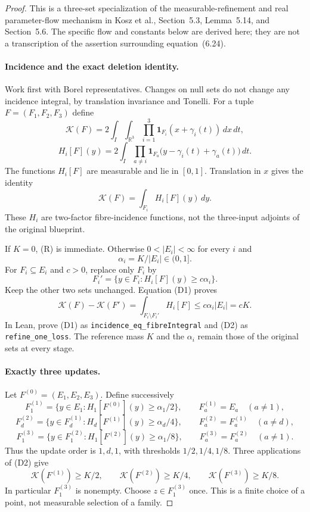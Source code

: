 \documentclass[11pt]{article}
\begin{document}
\begin{proof}
This is a three-set specialization of the measurable-refinement and real
parameter-flow mechanism in Kosz et al., Section~5.3, Lemma~5.14, and
Section~5.6. The specific flow and constants below are derived here; they
are not a transcription of the assertion surrounding equation~(6.24).

\paragraph{Incidence and the exact deletion identity.}
Work first with Borel representatives. Changes on null sets do not change
any incidence integral, by translation invariance and Tonelli. For a tuple
$F=(F_1,F_2,F_3)$ define
\[
 \mathcal K(F)=2\int_I\int_{\mathbb R^3}
       \prod_{i=1}^3\mathbf1_{F_i}(x+\gamma_i(t))\,dx\,dt,
\]
\[
 H_i[F](y)=2\int_I\prod_{a\ne i}
 \mathbf1_{F_a}\bigl(y-\gamma_i(t)+\gamma_a(t)\bigr)\,dt.
\]
The functions $H_i[F]$ are measurable and lie in $[0,1]$. Translation in
$x$ gives the identity
\[
 \mathcal K(F)=\int_{F_i}H_i[F](y)\,dy.                 \tag{D1}
\]
These $H_i$ are two-factor fibre-incidence functions, not the three-input
adjoints of the original blueprint.

If $K=0$, (R) is immediate. Otherwise $0<|E_i|<\infty$ for every $i$ and
\[
 \alpha_i=K/|E_i|\in(0,1].
\]
For $F_i\subseteq E_i$ and $c>0$, replace only $F_i$ by
\[
 F_i'=\{y\in F_i:H_i[F](y)\geq c\alpha_i\}.
\]
Keep the other two sets unchanged. Equation (D1) proves
\[
 \mathcal K(F)-\mathcal K(F')
 =\int_{F_i\setminus F_i'}H_i[F]
 \leq c\alpha_i|E_i|=cK.                             \tag{D2}
\]
In Lean, prove (D1) as \texttt{incidence\_eq\_fibreIntegral} and (D2) as
\texttt{refine\_one\_loss}. The reference mass $K$ and the $\alpha_i$
remain those of the original sets at every stage.

\paragraph{Exactly three updates.}
Let $F^{(0)}=(E_1,E_2,E_3)$. Define successively
\[
 F^{(1)}_1=\{y\in E_1:H_1[F^{(0)}](y)\geq\alpha_1/2\},
 \qquad F^{(1)}_a=E_a\quad(a\ne1),
\]
\[
 F^{(2)}_d=\{y\in F^{(1)}_d:H_d[F^{(1)}](y)\geq\alpha_d/4\},
 \qquad F^{(2)}_a=F^{(1)}_a\quad(a\ne d),
\]
\[
 F^{(3)}_1=\{y\in F^{(2)}_1:H_1[F^{(2)}](y)\geq\alpha_1/8\},
 \qquad F^{(3)}_a=F^{(2)}_a\quad(a\ne1).
\]
Thus the update order is $1,d,1$, with thresholds $1/2,1/4,1/8$.
Three applications of (D2) give
\[
 \mathcal K(F^{(1)})\geq K/2,\qquad
 \mathcal K(F^{(2)})\geq K/4,\qquad
 \mathcal K(F^{(3)})\geq K/8.                        \tag{D3}
\]
In particular $F^{(3)}_1$ is nonempty. Choose $z\in F^{(3)}_1$ once.
This is a finite choice of a point, not measurable selection of a family.


\end{proof}
\end{document}
